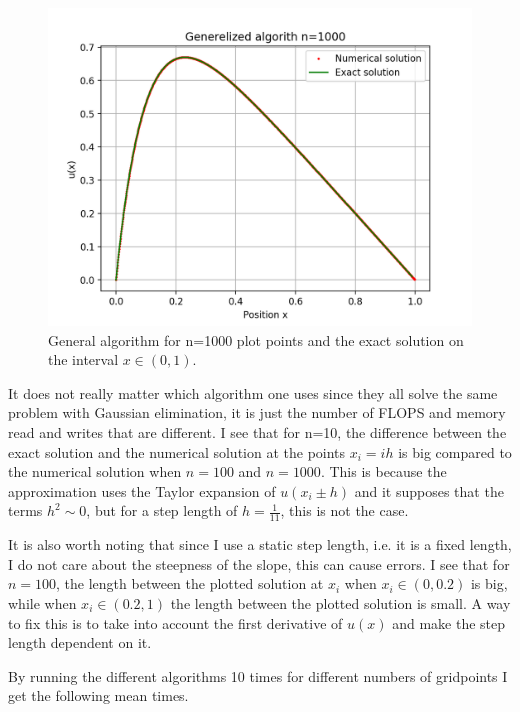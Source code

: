 \documentclass[12pt]{article}
\begin{document}
\begin{figure}[H]
  \center
  \includegraphics[scale=0.5]{alg-0-n1000plot.png}
  \caption{General algorithm for n=1000 plot points and the exact solution on the interval $x\in (0,1)$.}
  \label{fig:plotn1000}
\end{figure}

It does not really matter which algorithm one uses since they all solve the same problem with Gaussian elimination, it is just the number of FLOPS and memory read and writes that are different. I see that for n=10, the difference between the exact solution and the numerical solution at the points $x_i=ih$ is big compared to the numerical solution when $n=100$ and $n=1000$. This is because the approximation uses the Taylor expansion of $u(x_i\pm h)$ and it supposes that the terms $h^2\sim 0$, but for a step length of $h=\frac{1}{11}$, this is not the case. 

It is also worth noting that since I use a static step length, i.e. it is a fixed length, I do not care about the steepness of the slope, this can cause errors. I see that for $n=100$, the length between the plotted solution at $x_i$ when $x_i\in (0,0.2)$ is big, while when $x_i\in (0.2,1)$ the length between the plotted solution is small. A way to fix this is to take into account the first derivative of $u(x)$ and make the step length dependent on it.

By running the different algorithms 10 times for different numbers of gridpoints I get the following mean times.
\hfill\break
\end{document}
